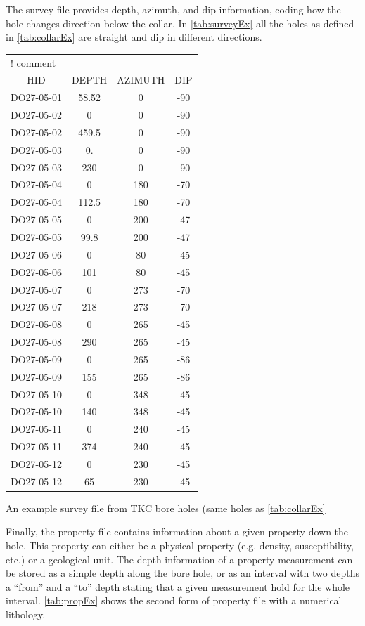 The survey file provides depth, azimuth, and dip information, coding how the hole changes direction below the collar. In \autoref{tab:surveyEx} all the holes as defined in  \autoref{tab:collarEx} are straight and dip in different directions. 
\begin{fileExample}
\begin{tabular}{|cccc|}
\hline
\multicolumn{4}{|l|}{! comment} \\
HID & DEPTH & AZIMUTH & DIP \\
DO27-05-01 & 58.52 & 0 & -90 \\
DO27-05-02 & 0 & 0 & -90 \\
DO27-05-02 & 459.5 & 0 & -90 \\
DO27-05-03 & 0. & 0 & -90 \\
DO27-05-03 & 230 & 0 & -90 \\
DO27-05-04 & 0 & 180 & -70 \\
DO27-05-04 & 112.5 & 180 & -70 \\
DO27-05-05 & 0 & 200 & -47 \\
DO27-05-05 & 99.8 & 200 & -47 \\
DO27-05-06 & 0 & 80 & -45 \\
DO27-05-06 & 101 & 80 & -45 \\
DO27-05-07 & 0 & 273 & -70 \\
DO27-05-07 & 218 & 273 & -70 \\
DO27-05-08 & 0 & 265 & -45 \\
DO27-05-08 & 290 & 265 & -45 \\
DO27-05-09 & 0 & 265 & -86 \\
DO27-05-09 & 155 & 265 & -86 \\
DO27-05-10 & 0 & 348 & -45 \\
DO27-05-10 & 140 & 348 & -45 \\
DO27-05-11 & 0 & 240 & -45 \\
DO27-05-11 & 374 & 240 & -45 \\
DO27-05-12 & 0 & 230 & -45 \\
DO27-05-12 & 65 & 230 & -45 \\
\hline
\end{tabular}
\caption{An example survey file from TKC bore holes (same holes as \autoref{tab:collarEx}}
\label{tab:surveyEx}
\end{fileExample}

Finally, the property file contains information about a given property down the hole. This property can either be a physical property (e.g. density, susceptibility, etc.) or a geological unit. The depth information of a property measurement can be stored as a simple depth along the bore hole, or as an interval with two depths a ``from'' and a ``to'' depth stating that a given measurement hold for the whole interval. \autoref{tab:propEx} shows the second form of property file with a numerical lithology.

